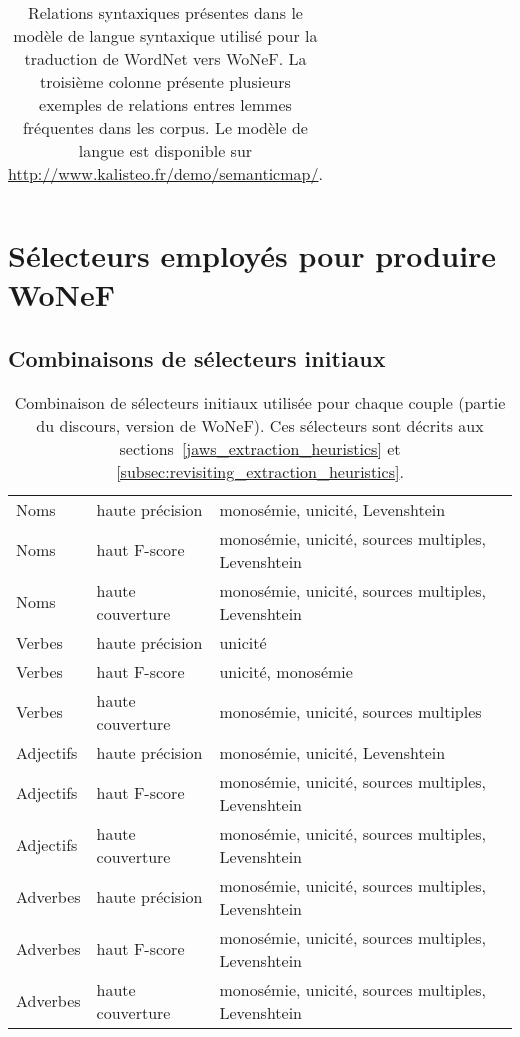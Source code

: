 \documentclass[oneside,parskip]{scrbook}
\begin{document}
\begin{longtable}{lll}
    \caption{\label{table:relationswonef}Relations syntaxiques présentes dans
        le modèle de langue syntaxique utilisé pour la traduction de WordNet
        vers WoNeF. La troisième colonne présente plusieurs exemples de
        relations entres lemmes fréquentes dans les corpus. Le modèle de langue
    est disponible sur \protect\url{http://www.kalisteo.fr/demo/semanticmap/}.}
\end{longtable}



\section{Sélecteurs employés pour produire WoNeF}
\label{selecteurs_wonef}

\subsection{Combinaisons de sélecteurs initiaux}

\begin{table}[ht]
    \centering
    \begin{tabular}{lll}
        \toprule
        Noms &  haute précision &  monosémie, unicité, Levenshtein \\
        Noms &  haut F-score    &  monosémie, unicité, sources multiples, Levenshtein \\
        Noms &  haute couverture  &  monosémie, unicité, sources multiples, Levenshtein \\
        \midrule
        Verbes &  haute précision &  unicité \\
        Verbes &  haut F-score    &  unicité, monosémie \\
        Verbes &  haute couverture  &  monosémie, unicité, sources multiples \\
        \midrule
        Adjectifs  &  haute précision &  monosémie, unicité, Levenshtein \\
        Adjectifs  &  haut F-score    &  monosémie, unicité, sources multiples, Levenshtein \\
        Adjectifs  &  haute couverture  &  monosémie, unicité, sources multiples, Levenshtein \\
        \midrule
        Adverbes  &  haute précision &  monosémie, unicité, sources multiples, Levenshtein \\
        Adverbes  &  haut F-score    &  monosémie, unicité, sources multiples, Levenshtein \\
        Adverbes  &  haute couverture  &  monosémie, unicité, sources multiples, Levenshtein \\
        \bottomrule
    \end{tabular}
    \caption{Combinaison de sélecteurs initiaux utilisée pour chaque couple
    (partie du discours, version de WoNeF). Ces sélecteurs sont décrits aux
sections~\ref{jaws_extraction_heuristics} et
\ref{subsec:revisiting_extraction_heuristics}.}
\end{table}
\end{document}
